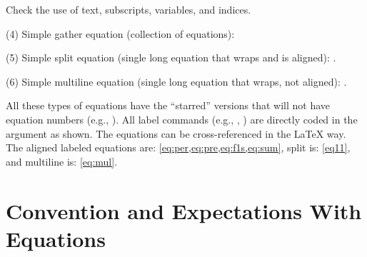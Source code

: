 \documentclass[ms-thesis,mathdesign,chpterrefs,showgrid]{ndsu-thesis-tagged}%
\begin{document}
Check the use of text, subscripts, variables, and indices. 

(4) Simple gather equation (collection of equations): \:  \repText[18]


(5) Simple split equation (single long equation that wraps and is aligned): . \repText[14]


(6) Simple multiline equation (single long equation that wraps, not aligned): . \repText[12]


All these types of equations have the ``starred'' versions that will not have equation numbers (e.g., ). All label commands (e.g., , ) are directly coded in the argument as shown. The equations can be cross-referenced in the \LaTeX{} way. The aligned labeled equations are: \cref{eq:per,eq:pre,eq:f1s,eq:sum}, split is: \cref{eq11}, and multiline is: \cref{eq:mul}. 


\mysectop
\section{Convention and Expectations With Equations}

\end{document}
